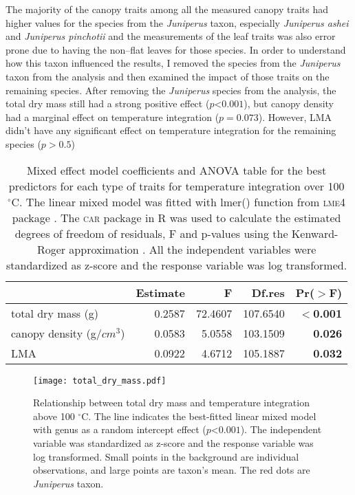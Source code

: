 \documentclass{ttuthes2007}
\newcommand{\pkg}[1]{\textsc{#1}}
\begin{document}
The majority of the canopy traits among all the measured canopy traits had higher values for the species from the \emph{Juniperus} taxon, especially \emph{Juniperus ashei} and \emph{Juniperus pinchotii} and the measurements of the leaf traits was also error prone due to having the non--flat leaves for those species. In order to understand how this taxon influenced the results, I removed the species from the \emph{Juniperus} taxon from the analysis and then examined the impact of those traits on the remaining species. After removing the \emph{Juniperus} species from the analysis, the total dry mass still had a strong positive effect ($p $<$ 0.001$), but canopy density had a marginal effect on temperature integration ($p = 0.073$). However, LMA didn't have any significant effect on temperature integration for the remaining species ($p > 0.5$) 



\begin{table}
\centering
\caption{Mixed effect model coefficients and ANOVA table for the best predictors for each type of traits for temperature integration over 100 $^{\circ}$C. The linear mixed model was fitted with lmer() function from \pkg{lme4} package \citep{bates2009package}. The \pkg{car} package in R \citep{fox2013hypothesis} was used to calculate the estimated degrees of freedom of residuals, F and p-values using the Kenward-Roger approximation \citep{kenward1997small}. All the independent variables were standardized  as z-score and the response variable was log transformed.}
\vspace{0.5 cm}
\begin{tabular}{lrrrr}
  \hline
 &  Estimate & F  & Df.res & Pr($>$F) \\ 
  \hline 
  total dry mass (g) & 0.2587 & 72.4607  & 107.6540 & \textbf{$<$0.001} \\ 
  canopy density (g/{$cm^3$}) & 0.0583 & 5.0558  & 103.1509 & \textbf{0.026} \\ 
  LMA & 0.0922 & 4.6712 &  105.1887 & \textbf{0.032} \\ 
   \hline
\end{tabular}
\label{tab:fandpstatfortemp}
\end{table}


\begin{figure}[ht]
    \centering
    \texttt{[image: total\_dry\_mass.pdf]}
    \caption[Dry mass effect on temperature integration]{\label{fig:dm-tempint}Relationship between total dry mass and temperature integration above 100 $^{\circ}$C. The line indicates the best-fitted linear mixed model with genus as a random intercept effect ($p $<$ 0.001$). The independent variable was standardized  as z-score and the response variable was log transformed. Small points in the background are individual observations, and large points are taxon's mean. The red dots are \emph{Juniperus} taxon.}
\end{figure}
\end{document}
